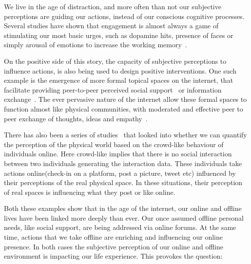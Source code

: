 We live in the age of distraction, and more often than not our subjective perceptions are guiding our actions, instead of our conscious cognitive processes. Several studies have shown that engagement is almost always a game of stimulating our most basic urges, such as dopamine hits, presence of faces or simply arousal of emotions to increase the working memory~\cite{bakhshi2014faces,joglekar2017like,schupp2006emotion,soat2015social}. 

On the positive side of this story, the capacity of subjective perceptions to influence actions, is also being used to design positive interventions. One such example is the emergence of more formal topical spaces on the internet, that facilitate providing peer-to-peer perceived social support~\cite{coulson2005receiving,balasooriya2016barriers} or information exchange~\cite{frost2008social}. The ever pervasive nature of the internet allow these formal spaces to function almost like physical communities, with moderated and effective peer to peer exchange of thoughts, ideas and empathy~\cite{kummervold2002social,squire2015should,hwang2010social}.

There has also been a series of studies~\cite{jang2019crowd,quercia2014aesthetic,quercia2015smelly,quercia2015chatty,quercia2014shortest} that looked into whether we can quantify the perception of the physical world based on the crowd-like behaviour of individuals online. Here crowd-like implies that there is no social interaction between two individuals generating the interaction data. These individuals take actions online(check-in on a platform, post a picture, tweet etc) influenced by their perceptions of the real physical space. In these situations, their perception of real spaces is influencing what they post or like online.
 
Both these examples show that in the age of the internet, our online and offline lives have been linked more deeply than ever. Our once assumed offline personal needs, like social support,  are being addressed via online forums. At the same time, actions that we take offline are enriching and influencing our online presence. In both cases the subjective perception of our online and offline environment is impacting our life experience. This provokes the question:

\noindent{}

